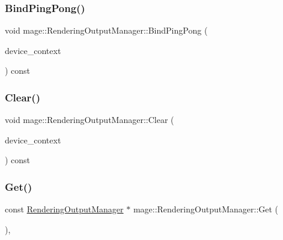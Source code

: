 \subsubsection{\texorpdfstring{Bind\+Ping\+Pong()}{BindPingPong()}}
{\footnotesize\ttfamily void mage\+::\+Rendering\+Output\+Manager\+::\+Bind\+Ping\+Pong (\begin{DoxyParamCaption}\item[{I\+D3\+D11\+Device\+Context2 $\ast$}]{device\+\_\+context }\end{DoxyParamCaption}) const\hspace{0.3cm}{\ttfamily [noexcept]}}

\hypertarget{classmage_1_1_rendering_output_manager_ab1c047e436dd77b032dedd3958c28414}{}\label{classmage_1_1_rendering_output_manager_ab1c047e436dd77b032dedd3958c28414} 
\subsubsection{\texorpdfstring{Clear()}{Clear()}}
{\footnotesize\ttfamily void mage\+::\+Rendering\+Output\+Manager\+::\+Clear (\begin{DoxyParamCaption}\item[{I\+D3\+D11\+Device\+Context2 $\ast$}]{device\+\_\+context }\end{DoxyParamCaption}) const\hspace{0.3cm}{\ttfamily [noexcept]}}

\hypertarget{classmage_1_1_rendering_output_manager_afc3d9dcc274a281e26110f6b43ec6c62}{}\label{classmage_1_1_rendering_output_manager_afc3d9dcc274a281e26110f6b43ec6c62} 
\subsubsection{\texorpdfstring{Get()}{Get()}}
{\footnotesize\ttfamily const \hyperlink{classmage_1_1_rendering_output_manager}{Rendering\+Output\+Manager} $\ast$ mage\+::\+Rendering\+Output\+Manager\+::\+Get (\begin{DoxyParamCaption}{ }\end{DoxyParamCaption})\hspace{0.3cm}{\ttfamily [static]}, {\ttfamily [noexcept]}}

